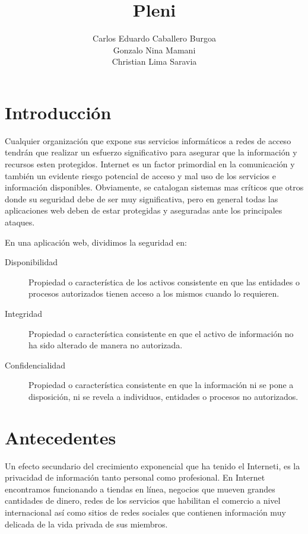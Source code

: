 \documentclass[letter,twoside,11pt]{article}
\title{\bf Pleni}
\author{
    Carlos Eduardo Caballero Burgoa \\
    Gonzalo Nina Mamani \\
    Christian Lima Saravia \\
}
\newcommand{\blankpage}{
\newpage
\thispagestyle{empty}
\mbox{}
\newpage
}
\begin{document}
\maketitle

\blankpage
\tableofcontents
\pagebreak

\section{Introducción}
Cualquier organización que expone sus servicios informáticos a redes de acceso
tendrán que realizar un esfuerzo significativo para asegurar que la información
y recursos esten protegidos. Internet es un factor primordial en la comunicación
y también un evidente riesgo potencial de acceso y mal uso de los servicios e
información disponibles. Obviamente, se catalogan sistemas mas críticos que
otros donde su seguridad debe de ser muy significativa, pero en general todas
las aplicaciones web deben de estar protegidas y aseguradas ante los principales
ataques.

En una aplicación web, dividimos la seguridad en:

\begin{description}
    \item [Disponibilidad] Propiedad o característica de los activos consistente
        en que las entidades o procesos autorizados tienen acceso a los mismos
        cuando lo requieren.
    \item [Integridad] Propiedad o característica consistente en que el activo
        de información no ha sido alterado de manera no autorizada.
    \item [Confidencialidad] Propiedad o característica consistente en que la
        información ni se pone a disposición, ni se revela a individuos,
        entidades o procesos no autorizados.
\end{description}

\section{Antecedentes}
Un efecto secundario del crecimiento exponencial que ha tenido el Interneti, es
la privacidad de información tanto personal como profesional. En Internet
encontramos funcionando a tiendas en línea, negocios que mueven grandes
cantidades de dinero, redes de los servicios que habilitan el comercio a nivel
internacional así como sitios de redes sociales que contienen información muy
delicada de la vida privada de sus miembros.
\end{document}
